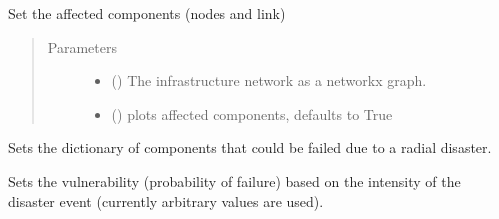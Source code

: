 \documentclass[letterpaper,10pt,english]{sphinxmanual}
\begin{document}
\begin{fulllineitems}
\begin{fulllineitems}
\label{\detokenize{apidoc:dreaminsg_integrated_model.src.hazard_initiator.RadialDisruption.set_affected_components}}
\sphinxAtStartPar
Set the affected components (nodes and link)
\begin{quote}\begin{description}
\item[{Parameters}] \leavevmode\begin{itemize}
\item {} 
\sphinxAtStartPar
{} () \textendash{} The infrastructure network as a networkx graph.

\item {} 
\sphinxAtStartPar
{} (\sphinxstyleliteralemphasis{\sphinxupquote{, }}) \textendash{} plots affected components, defaults to True

\end{itemize}

\end{description}\end{quote}

\end{fulllineitems}


\begin{fulllineitems}
\label{\detokenize{apidoc:dreaminsg_integrated_model.src.hazard_initiator.RadialDisruption.set_fail_compon_dict}}
\sphinxAtStartPar
Sets the dictionary of components that could be failed due to a radial disaster.

\end{fulllineitems}


\begin{fulllineitems}
\label{\detokenize{apidoc:dreaminsg_integrated_model.src.hazard_initiator.RadialDisruption.set_intensity_failure_probability}}
\sphinxAtStartPar
Sets the vulnerability (probability of failure) based on the intensity of the disaster event (currently arbitrary values are used).


\end{fulllineitems}
\end{fulllineitems}
\end{document}
